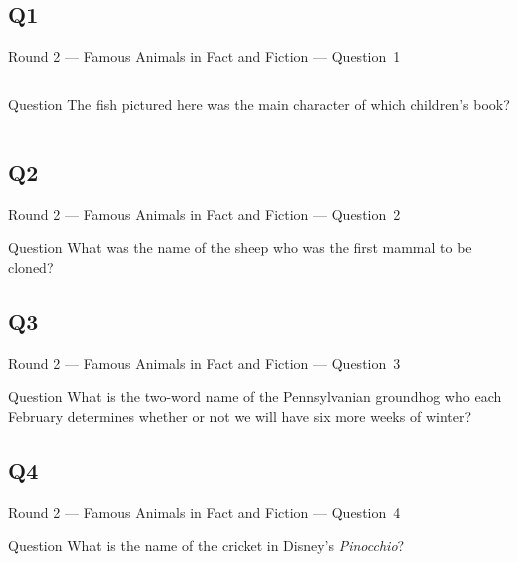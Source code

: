 \documentclass[11pt]{beamer}
\begin{document}
\subsection*{Q1}
\begin{frame}[t]{Round 2 --- Famous Animals in Fact and Fiction --- \mbox{Question 1}}
\vspace{-0.5em}
\begin{columns}[T,totalwidth=\linewidth]
\begin{column}{0.32\linewidth}
\begin{block}{Question}
The fish pictured here was the main character of which children's book?
\end{block}
\end{column}
\begin{column}{0.65\linewidth}
\begin{center}
\texttt{[image: \{Images/rainbowfish]}.jpeg}
\end{center}
\end{column}
\end{columns}
\end{frame}
\subsection*{Q2}
\begin{frame}[t]{Round 2 --- Famous Animals in Fact and Fiction --- \mbox{Question 2}}
\vspace{-0.5em}
\begin{block}{Question}
What was the name of the sheep who was the first mammal to be cloned?
\end{block}
\end{frame}
\subsection*{Q3}
\begin{frame}[t]{Round 2 --- Famous Animals in Fact and Fiction --- \mbox{Question 3}}
\vspace{-0.5em}
\begin{block}{Question}
What is the two-word name of the Pennsylvanian groundhog who each February determines whether or not we will have six more weeks of winter? 
\end{block}
\end{frame}
\subsection*{Q4}
\begin{frame}[t]{Round 2 --- Famous Animals in Fact and Fiction --- \mbox{Question 4}}
\vspace{-0.5em}
\begin{block}{Question}
What is the name of the cricket in Disney's \emph{Pinocchio}?
\end{block}
\end{frame}
\end{document}
